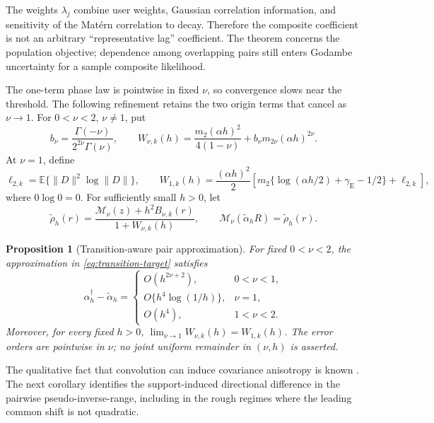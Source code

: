 \documentclass[11pt]{article}
\newtheorem{proposition}{Proposition}
\theoremstyle{remark}
\newcommand{\Matern}{\mathcal M}
\newcommand{\E}{\mathbb E}
\begin{document}
The weights \(\lambda_j\) combine user weights, Gaussian correlation
information, and sensitivity of the Matérn correlation to decay. Therefore the
composite coefficient is not an arbitrary ``representative lag'' coefficient.
The theorem concerns the population objective; dependence among overlapping
pairs still enters Godambe uncertainty for a sample composite likelihood.

The one-term phase law is pointwise in fixed \(\nu\), so convergence slows near
the threshold.  The following refinement retains the two origin terms that
cancel as \(\nu\to1\).  For \(0<\nu<2\), \(\nu\ne1\), put
\begin{equation}
  b_\nu=\frac{\Gamma(-\nu)}{2^{2\nu}\Gamma(\nu)},\qquad
  W_{\nu,k}(h)=\frac{m_2(\alpha h)^2}{4(1-\nu)}
  +b_\nu m_{2\nu}(\alpha h)^{2\nu}.
  \label{eq:transition-W-noninteger}
\end{equation}
At \(\nu=1\), define
\begin{equation}
  \ell_{2,k}=\E\{\lVert D\rVert^2\log\lVert D\rVert\},\qquad
  W_{1,k}(h)=\frac{(\alpha h)^2}{2}\left[
  m_2\{\log(\alpha h/2)+\gamma_{\mathrm E}-1/2\}+\ell_{2,k}
  \right],
  \label{eq:transition-W-one}
\end{equation}
where \(0\log0=0\).  For sufficiently small \(h>0\), let
\begin{equation}
  \widetilde\rho_h(r)
  =\frac{\Matern_\nu(z)+h^2B_{\nu,k}(r)}{1+W_{\nu,k}(h)},\qquad
  \Matern_\nu(\widetilde\alpha_h R)=\widetilde\rho_h(r).
  \label{eq:transition-target}
\end{equation}

\begin{proposition}[Transition-aware pair approximation]
\label{prop:transition-aware}
For fixed \(0<\nu<2\), the approximation in
\eqref{eq:transition-target} satisfies
\begin{equation}
  \alpha_h^\dagger-\widetilde\alpha_h=
  \begin{cases}
    O(h^{2\nu+2}), & 0<\nu<1,\\
    O\{h^4\log(1/h)\}, & \nu=1,\\
    O(h^4), & 1<\nu<2.
  \end{cases}
  \label{eq:transition-target-error}
\end{equation}
Moreover, for every fixed \(h>0\),
\(\lim_{\nu\to1}W_{\nu,k}(h)=W_{1,k}(h)\).
The error orders are pointwise in \(\nu\); no joint uniform remainder in
\((\nu,h)\) is asserted.
\end{proposition}

The qualitative fact that convolution can induce covariance anisotropy is
known \citep{clifford2006yield,paciorek2006nonstationary}.  The next corollary
identifies the support-induced directional difference in the pairwise
pseudo-inverse-range, including in the rough regimes where the leading common
shift is not quadratic.
\end{document}
